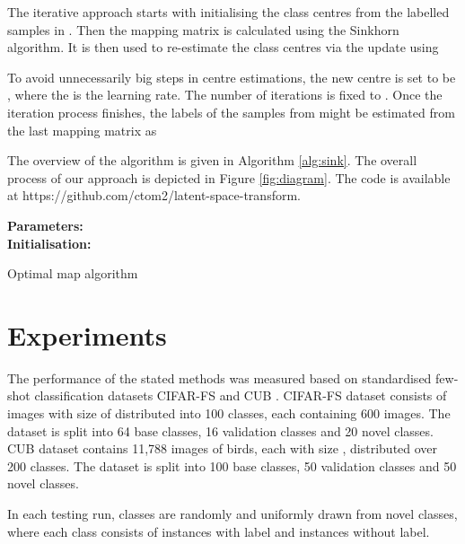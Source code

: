 \documentclass[letterpaper]{article} \usepackage{aaai20}  \usepackage{times}  \usepackage{helvet} \usepackage{courier}  \usepackage[hyphens]{url}  \usepackage{graphicx} \urlstyle{rm} \def\UrlFont{\rm}  \usepackage{graphicx}  \frenchspacing  \setlength{\pdfpagewidth}{8.5in}  \setlength{\pdfpageheight}{11in}  \usepackage[ruled,vlined]{algorithm2e}
\begin{document}
The iterative approach starts with initialising the class centres from the labelled samples in . 
Then the mapping matrix  is calculated using the Sinkhorn algorithm. It is then used to re-estimate the class centres via the update using

To avoid unnecessarily big steps in centre estimations, the new centre is set to be , where the  is the learning rate. The number of iterations is fixed to . Once the iteration process finishes, the labels of the samples from  might be estimated
from the last mapping matrix as 

The overview of the algorithm is given in Algorithm \ref{alg:sink}. The overall process of our approach is depicted in Figure \ref{fig:diagram}. The code is available at https://github.com/ctom2/latent-space-transform.

\begin{algorithm}
\SetAlgoLined
\textbf{Parameters:} \\
\textbf{Initialisation:} \\
 \Return{}
 \caption{Optimal map algorithm}
 \label{alg:sink}
\end{algorithm}

\section{Experiments}
The performance of the stated methods was measured based on standardised few-shot classification datasets CIFAR-FS \cite{bertinetto2019metalearning} and CUB \cite{WahCUB_200_2011}. CIFAR-FS dataset consists of images with size of  distributed into 100 classes, each containing 600 images. The dataset is split into 64 base classes, 16 validation classes and 20 novel classes. CUB dataset contains 11,788 images of birds, each with size , distributed over 200 classes. The dataset is split into 100 base classes, 50 validation classes and 50 novel classes.

In each testing run,  classes are randomly and uniformly drawn from novel classes, where each class consists of  instances with label and  instances without label.
\end{document}
